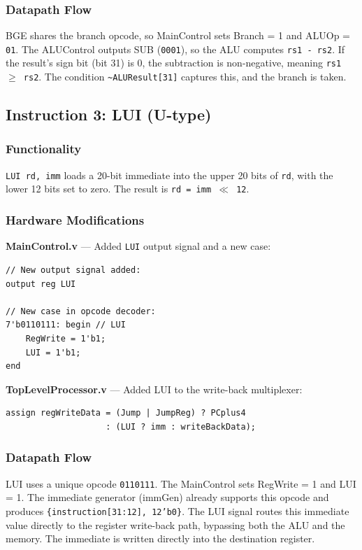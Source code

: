 \documentclass[12pt,a4paper]{article}
\begin{document}
\subsubsection{Datapath Flow}
BGE shares the branch opcode, so MainControl sets Branch = 1 and ALUOp = \texttt{01}. The ALUControl outputs SUB (\texttt{0001}), so the ALU computes \texttt{rs1 - rs2}. If the result's sign bit (bit 31) is 0, the subtraction is non-negative, meaning \texttt{rs1 $\geq$ rs2}. The condition \texttt{\~{}ALUResult[31]} captures this, and the branch is taken.

\subsection{Instruction 3: LUI (U-type)}

\subsubsection{Functionality}
\texttt{LUI rd, imm} loads a 20-bit immediate into the upper 20 bits of \texttt{rd}, with the lower 12 bits set to zero. The result is \texttt{rd = imm $\ll$ 12}.

\subsubsection{Hardware Modifications}

\textbf{MainControl.v} --- Added \texttt{LUI} output signal and a new case:
\begin{lstlisting}[style=verilog, caption={MainControl modification for LUI}]
// New output signal added:
output reg LUI

// New case in opcode decoder:
7'b0110111: begin // LUI
    RegWrite = 1'b1;
    LUI = 1'b1;
end
\end{lstlisting}

\textbf{TopLevelProcessor.v} --- Added LUI to the write-back multiplexer:
\begin{lstlisting}[style=verilog, caption={Write-back modification for LUI}]
assign regWriteData = (Jump | JumpReg) ? PCplus4
                    : (LUI ? imm : writeBackData);
\end{lstlisting}

\subsubsection{Datapath Flow}
LUI uses a unique opcode \texttt{0110111}. The MainControl sets RegWrite = 1 and LUI = 1. The immediate generator (immGen) already supports this opcode and produces \texttt{\{instruction[31:12], 12'b0\}}. The LUI signal routes this immediate value directly to the register write-back path, bypassing both the ALU and the memory. The immediate is written directly into the destination register.
\end{document}
